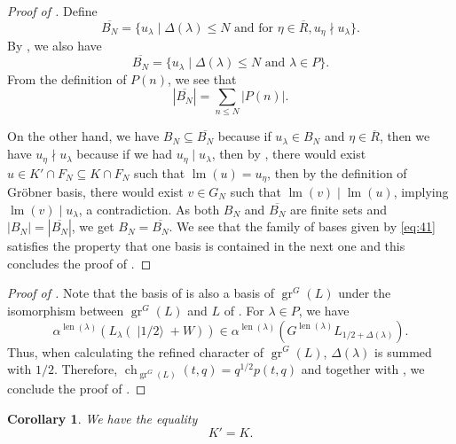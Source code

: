 \documentclass[a4paper, 12pt, reqno]{amsart}
\newtheorem{corollary}[theorem]{Corollary}
\theoremstyle{remark}
\numberwithin{equation}{subsection}
\DeclareMathOperator{\gr}{gr}
\DeclareMathOperator{\ch}{ch}
\DeclareMathOperator{\lm}{lm}
\DeclareMathOperator{\len}{len}
\DeclareMathOperator{\vachalf}{|1/2\rangle}
\begin{document}
\begin{proof}[Proof of ]
  Define
  \begin{equation*}
    \overline{B_N} = \{u_{\lambda} \mid \Delta(\lambda) \le N\text{ and for }\eta \in \overline{R}, u_{\eta} \nmid u_{\lambda}\}.
  \end{equation*}
  By , we also have
  \begin{equation*}
    \overline{B_N} = \{u_{\lambda} \mid \Delta(\lambda) \le N\text{ and }\lambda \in P\}.
  \end{equation*}
  From the definition of $P(n)$, we see that
  \begin{equation*}
    |\overline{B_N}| = \sum_{n \le N}|P(n)|.
  \end{equation*}

  On the other hand, we have $B_N \subseteq \overline{B_N}$ because if $u_{\lambda} \in B_N$ and $\eta \in \overline{R}$, then we have $u_{\eta} \nmid u_{\lambda}$ because if we had $u_{\eta} \mid u_{\lambda}$, then by , there would exist $u \in K' \cap F_N \subseteq K \cap F_N$ such that $\lm(u) = u_{\eta}$, then by the definition of Gr\"{o}bner basis, there would exist $v \in G_N$ such that $\lm(v) \mid \lm(u)$, implying $\lm(v) \mid u_{\lambda}$, a contradiction.
  As both $B_N$ and $\overline{B_N}$ are finite sets and $|B_N| = |\overline{B_N}|$, we get $B_N = \overline{B_N}$.
  We see that the family of bases given by \eqref{eq:41} satisfies the property that one basis is contained in the next one and this concludes the proof of .
\end{proof}

\begin{proof}[Proof of ]
  Note that the basis of  is also a basis of $\gr^G(L)$ under the isomorphism between $\gr^G(L)$ and $L$ of .
  For $\lambda \in P$, we have
  \begin{equation*}
    \alpha^{\len(\lambda)}(L_{\lambda}(\vachalf + W)) \in \alpha^{\len(\lambda)}(G^{\len(\lambda)}L_{1/2 + \Delta(\lambda)}).
  \end{equation*}
  Thus, when calculating the refined character of $\gr^G(L)$, $\Delta(\lambda)$ is summed with $1/2$.
  Therefore, $\ch_{\gr^G(L)}(t, q) = q^{1/2}p(t, q)$ and together with , we conclude the proof of .
\end{proof}

\begin{corollary}
  \label{crl:3}
  We have the equality
  \begin{equation*}
    K' = K.
  \end{equation*}
\end{corollary}
\end{document}
